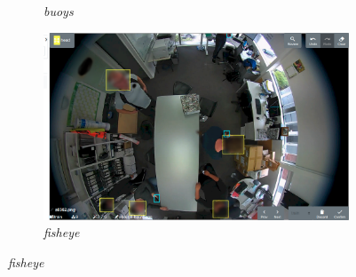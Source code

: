 \begin{figure}[htbp]
\begin{subfigure}[t]{0.24\linewidth}
   \caption{\emph{buoys}}
 \end{subfigure}
\begin{subfigure}[t]{0.24\linewidth}
  \includegraphics[width=1.0\linewidth]{figures/annotation/screenshots/victor.png}
  \caption{\emph{fisheye}}
\end{subfigure}%


\end{figure}
